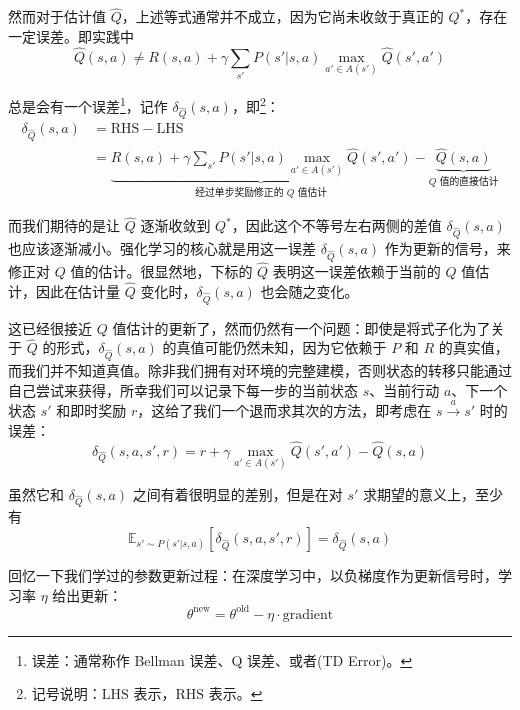 然而对于估计值 $\hat Q$，上述等式通常并不成立，因为它尚未收敛于真正的 $Q^*$，存在一定误差。即实践中
\[
    \hat Q (s, a) \ne R(s, a) + \gamma \sum_{s'} P(s' | s, a) \max_{a' \in A(s')} \hat Q (s', a')
\]

总是会有一个误差\footnote{误差：通常称作 Bellman 误差、Q 误差、或者(TD Error)。}，记作 $\delta_{\hat Q} (s, a)$，即\footnote{记号说明：$\text{LHS}$ 表示，$\text{RHS}$ 表示。}：
\[
    \begin{aligned}
        \delta_{\hat Q} (s, a) & = \text{RHS} - \text{LHS}                                                                                                                                                                  \\
                               & = \underset{\text{经过单步奖励修正的 $Q$ 值估计}}{\underbrace{R(s, a) + \gamma \sum_{s'} P(s' | s, a) \max_{a' \in A(s')} \hat Q (s', a')}} - \underset{\text{$Q$ 值的直接估计}}{\underbrace{\hat Q (s, a)}}
    \end{aligned}
\]

而我们期待的是让 $\hat Q$ 逐渐收敛到 $Q^*$，因此这个不等号左右两侧的差值 $\delta_{\hat Q} (s, a)$ 也应该逐渐减小。强化学习的核心就是用这一误差 $\delta_{\hat Q} (s, a)$ 作为更新的信号，来修正对 $Q$ 值的估计。很显然地，下标的 $\hat Q$ 表明这一误差依赖于当前的 $Q$ 值估计，因此在估计量 $\hat Q$ 变化时，$\delta_{\hat Q} (s, a)$ 也会随之变化。

这已经很接近 $Q$ 值估计的更新了，然而仍然有一个问题：即使是将式子化为了关于 $\hat Q$ 的形式，$\delta_{\hat Q} (s, a)$ 的真值可能仍然未知，因为它依赖于 $P$ 和 $R$ 的真实值，而我们并不知道真值。除非我们拥有对环境的完整建模，否则状态的转移只能通过自己尝试来获得，所幸我们可以记录下每一步的当前状态 $s$、当前行动 $a$、下一个状态 $s'$ 和即时奖励 $r$，这给了我们一个退而求其次的方法，即考虑在 $s \overset{a}{\to} s'$ 时的误差：
\[
    \delta_{\hat Q} (s, a, s', r) = r + \gamma \max_{a' \in A(s')} \hat Q (s', a') - \hat Q (s, a)
\]

虽然它和 $\delta_{\hat Q} (s, a)$ 之间有着很明显的差别，但是在对 $s'$ 求期望的意义上，至少有
\[
    \mathbb{E}_{s' \sim P(s' | s, a)}[\delta_{\hat Q} (s, a, s', r)] = \delta_{\hat Q} (s, a)
\]

回忆一下我们学过的参数更新过程：在深度学习中，以负梯度作为更新信号时，学习率 $\eta$ 给出更新：
\[
    \theta^{\text{new}} = \theta^{\text{old}} - \eta \cdot \text{gradient}
\]

